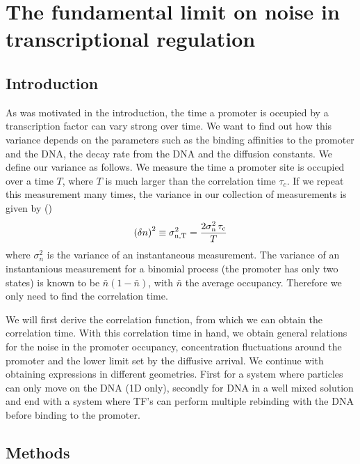 \section{The fundamental limit on noise in transcriptional regulation}

\subsection{Introduction}
As was motivated in the introduction, the time a promoter is occupied by a transcription factor can vary strong over time. We want to find out how this variance depends on the parameters such as the binding affinities to the promoter and the DNA, the decay rate from the DNA and the diffusion constants. We define our variance as follows. We measure the time a promoter site is occupied over a time $T$, where $T$ is much larger than the correlation time $\tau_c$. If we repeat this measurement many times, the variance in our collection of measurements is given by ()
\begin{equation}
 \left( \delta n \right)^2 \equiv \sigma_{\rm n, T}^2 = \frac{2 \sigma_{\rm n}^2 \,\tau_{\rm c}}{T}
 \elabel{std_devT}
\end{equation}
where $\sigma_n^2$ is the variance of an instantaneous measurement. The variance of an instantanious measurement for a binomial process (the promoter has only two states) is known to be $\bar{n}(1-\bar{n})$, with $\bar{n}$ the average occupancy. Therefore we only need to find the correlation time. 

We will first derive the correlation function, from which we can obtain the correlation time. With this correlation time in hand, we obtain general relations for the noise in the promoter occupancy, concentration fluctuations around the promoter and the lower limit set by the diffusive arrival. We continue with obtaining expressions in different geometries. First for a system where particles can only move on the DNA (1D only), secondly for DNA in a well mixed solution and end with a system where TF's can perform multiple rebinding with the DNA before binding to the promoter.


\subsection{Methods}


